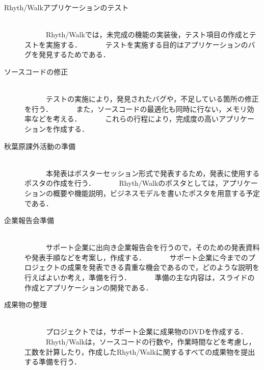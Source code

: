 \begin{description}
\item[Rhyth/Walkアプリケーションのテスト]\mbox{}\\
　　　Rhyth/Walkでは，未完成の機能の実装後，テスト項目の作成とテストを実施する．
　　　テストを実施する目的はアプリケーションのバグを発見するためである．

\item[ソースコードの修正]\mbox{}\\
　　　テストの実施により，発見されたバグや，不足している箇所の修正を行う．
　　　また，ソースコードの最適化も同時に行ない，メモリ効率などを考える．
　　　これらの行程により，完成度の高いアプリケーションを作成する．

\item[秋葉原課外活動の準備]\mbox{}\\
　　　本発表はポスターセッション形式で発表するため，発表に使用するポスタの作成を行う．
　　　Rhyth/Walkのポスタとしては，アプリケーションの概要や機能説明，ビジネスモデルを書いたポスタを用意する予定である．

\item[企業報告会準備]\mbox{}\\
　　　サポート企業に出向き企業報告会を行うので，そのための発表資料や発表手順などを考案し，作成する．
　　　サポート企業に今までのプロジェクトの成果を発表できる貴重な機会であるので，どのような説明を行えばよいか考え，準備を行う．
　　　準備の主な内容は，スライドの作成とアプリケーションの開発である．

\item[成果物の整理]\mbox{}\\
　　　プロジェクトでは，サポート企業に成果物のDVDを作成する．
　　　Rhyth/Walkは，ソースコードの行数や，作業時間などを考慮し，工数を計算したり，作成したRhyth/Walkに関するすべての成果物を提出する準備を行う．

\end{description}

